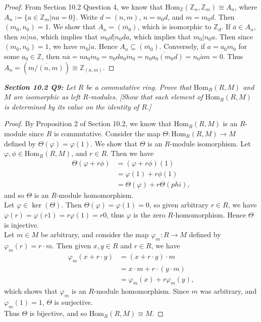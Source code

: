\documentclass{article}
\begin{document}
  \begin{proof}
    From Section 10.2 Question 4, we know that
    $\text{Hom}_{\mathbb{Z}}(\mathbb{Z}_n,\mathbb{Z}_m) \cong A_n$, where
    $A_n:=\{a\in\mathbb{Z}_{m}|na=0\}$. 
    Write $d=(n,m)$, $n=n_0d$, and $m=m_0d$. Then $(m_0,n_0)=1$. We show
    that $A_n=(\overline{m_0})$, which is isomorphic to $\mathbb{Z}_{d}$.
    If $\bar{a}\in A_n$, then $m|na$, which implies that $m_0d|n_0da$,
    which implies that $m_0|n_0a$. Then since $(m_0,n_0)=1$, we have
    $m_0|a$. Hence $A_n\subseteq(\overline{m_0})$. Conversely, if $a=a_0m_0$
    for some $a_0\in\mathbb{Z}$, then $n\overline{a} =n\overline{a_0m_0}
    =n_0d\overline{a_0m_0} =\overline{n_0a_0(m_0d)} =\overline{n_0am} =0$.
    Thus $A_n=(\overline{m/(n,m)}) \cong\mathbb{Z}_{(n,m)}$.
  \end{proof}

\it \textbf{Section 10.2 Q9:} Let $R$ be a commutative ring. Prove that
  $\text{Hom}_R(R,M)$ and $M$ are isomorphic as left $R$-modules. [Show
  that each element of $\text{Hom}_R(R,M)$ is determined by its value on
  the identity of $R$.]

  \begin{proof}
    By Proposition 2 of Section 10.2, we know that $\text{Hom}_R(R,M)$ is
    an $R$-module since $R$ is commutative. Consider the map
    $\Theta:\text{Hom}_R(R,M)\rightarrow M$ defined by
    $\Theta(\varphi)=\varphi(1)$. We show that $\Theta$ is an $R$-module
    isomorphism. Let $\varphi,\phi\in\text{Hom}_R(R,M)$, and $r\in R$. Then
    we have
    \begin{align*}
      \Theta(\varphi+r\phi) &=(\varphi+r\phi)(1) \\
      &=\varphi(1)+r\phi(1) \\
      &=\Theta(\varphi)+r\Theta(phi),
    \end{align*}
    and so $\Theta$ is an $R$-module homomorphism. \\

    Let $\varphi\in\ker(\Theta)$. Then $\Theta(\varphi)=\varphi(1)=0$, so
    given arbitrary $r\in R$, we have $\varphi(r) =\varphi(r1)
    =r\varphi(1) =r0$, thus $\varphi$ is the zero $R$-homomorphism. Hence
    $\Theta$ is injective. \\

    Let $m\in M$ be arbitrary, and consider the map $\varphi_m:R\rightarrow
    M$ defined by $\varphi_m(r)=r\cdot m$. Then given $x,y\in R$ and $r\in
    R$, we have
    \begin{align*}
      \varphi_m(x+r\cdot y) &=(x+r\cdot y)\cdot m \\
      &=x\cdot m + r\cdot(y\cdot m) \\
      &=\varphi_m(x) + r\varphi_m(y),
    \end{align*}
    which shows that $\varphi_m$ is an $R$-module homomorphism. Since $m$
    was arbitrary, and $\varphi_m(1)=1$, $\Theta$ is surjective. \\

    Thus $\Theta$ is bijective, and so $\text{Hom}_R(R,M)\cong M$.
  \end{proof}
\end{document}
